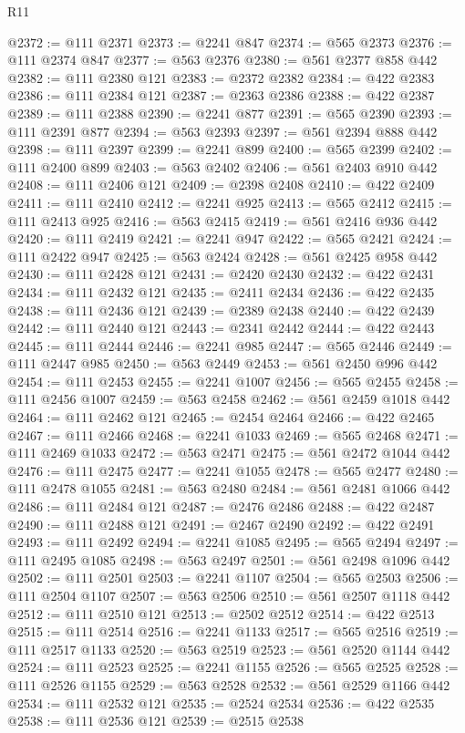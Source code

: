 \begin{lexlean}{R11}
\begin{coremodule}
{{{{{{{{{{{{{{{{{{{{{{{{{{{{{{{{{{{{{{{{{{{{{{{{{{{{{{{{{{{{{{{{{{{{{{{{{{{{{{{{{{@2372 := @111 @2371
@2373 := @2241 @847
@2374 := @565 @2373
@2376 := @111 @2374 @847
@2377 := @563 @2376
@2380 := @561 @2377 @858 @442
@2382 := @111 @2380 @121
@2383 := @2372 @2382
@2384 := @422 @2383
@2386 := @111 @2384 @121
@2387 := @2363 @2386
@2388 := @422 @2387
@2389 := @111 @2388
@2390 := @2241 @877
@2391 := @565 @2390
@2393 := @111 @2391 @877
@2394 := @563 @2393
@2397 := @561 @2394 @888 @442
@2398 := @111 @2397
@2399 := @2241 @899
@2400 := @565 @2399
@2402 := @111 @2400 @899
@2403 := @563 @2402
@2406 := @561 @2403 @910 @442
@2408 := @111 @2406 @121
@2409 := @2398 @2408
@2410 := @422 @2409
@2411 := @111 @2410
@2412 := @2241 @925
@2413 := @565 @2412
@2415 := @111 @2413 @925
@2416 := @563 @2415
@2419 := @561 @2416 @936 @442
@2420 := @111 @2419
@2421 := @2241 @947
@2422 := @565 @2421
@2424 := @111 @2422 @947
@2425 := @563 @2424
@2428 := @561 @2425 @958 @442
@2430 := @111 @2428 @121
@2431 := @2420 @2430
@2432 := @422 @2431
@2434 := @111 @2432 @121
@2435 := @2411 @2434
@2436 := @422 @2435
@2438 := @111 @2436 @121
@2439 := @2389 @2438
@2440 := @422 @2439
@2442 := @111 @2440 @121
@2443 := @2341 @2442
@2444 := @422 @2443
@2445 := @111 @2444
@2446 := @2241 @985
@2447 := @565 @2446
@2449 := @111 @2447 @985
@2450 := @563 @2449
@2453 := @561 @2450 @996 @442
@2454 := @111 @2453
@2455 := @2241 @1007
@2456 := @565 @2455
@2458 := @111 @2456 @1007
@2459 := @563 @2458
@2462 := @561 @2459 @1018 @442
@2464 := @111 @2462 @121
@2465 := @2454 @2464
@2466 := @422 @2465
@2467 := @111 @2466
@2468 := @2241 @1033
@2469 := @565 @2468
@2471 := @111 @2469 @1033
@2472 := @563 @2471
@2475 := @561 @2472 @1044 @442
@2476 := @111 @2475
@2477 := @2241 @1055
@2478 := @565 @2477
@2480 := @111 @2478 @1055
@2481 := @563 @2480
@2484 := @561 @2481 @1066 @442
@2486 := @111 @2484 @121
@2487 := @2476 @2486
@2488 := @422 @2487
@2490 := @111 @2488 @121
@2491 := @2467 @2490
@2492 := @422 @2491
@2493 := @111 @2492
@2494 := @2241 @1085
@2495 := @565 @2494
@2497 := @111 @2495 @1085
@2498 := @563 @2497
@2501 := @561 @2498 @1096 @442
@2502 := @111 @2501
@2503 := @2241 @1107
@2504 := @565 @2503
@2506 := @111 @2504 @1107
@2507 := @563 @2506
@2510 := @561 @2507 @1118 @442
@2512 := @111 @2510 @121
@2513 := @2502 @2512
@2514 := @422 @2513
@2515 := @111 @2514
@2516 := @2241 @1133
@2517 := @565 @2516
@2519 := @111 @2517 @1133
@2520 := @563 @2519
@2523 := @561 @2520 @1144 @442
@2524 := @111 @2523
@2525 := @2241 @1155
@2526 := @565 @2525
@2528 := @111 @2526 @1155
@2529 := @563 @2528
@2532 := @561 @2529 @1166 @442
@2534 := @111 @2532 @121
@2535 := @2524 @2534
@2536 := @422 @2535
@2538 := @111 @2536 @121
@2539 := @2515 @2538
}}}}}}}}}}}}}}}}}}}}}}}}}}}}}}}}}}}}}}}}}}}}}}}}}}}}}}}}}}}}}}}}}}}}}}}}}}}}}}}}}}
\end{coremodule}
\end{lexlean}

